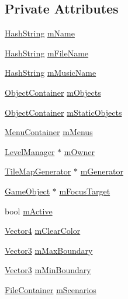 \subsection*{Private Attributes}
\begin{DoxyCompactItemize}
\item 
\hyperlink{classHashString}{Hash\+String} \hyperlink{classLevel_ae33d8a4a8a50bf09ce19ff784509e77b}{m\+Name}
\item 
\hyperlink{classHashString}{Hash\+String} \hyperlink{classLevel_af1e1923aba1e95e5a8e895f840460407}{m\+File\+Name}
\item 
\hyperlink{classHashString}{Hash\+String} \hyperlink{classLevel_af2e193876cae73a475abbe27a1a9f972}{m\+Music\+Name}
\item 
\hyperlink{classLevel_afd39ad8a5d9272ab8e14853e0fb18a48}{Object\+Container} \hyperlink{classLevel_a66c3ffb86f6e61570f833046e7994d43}{m\+Objects}
\item 
\hyperlink{classLevel_afd39ad8a5d9272ab8e14853e0fb18a48}{Object\+Container} \hyperlink{classLevel_afce9aca707faf2694e54e50f41feb035}{m\+Static\+Objects}
\item 
\hyperlink{classLevel_a8ca95fd4c2a029af4f4df92c24556314}{Menu\+Container} \hyperlink{classLevel_a42a19fd951df82d14d6848a09ea93d57}{m\+Menus}
\item 
\hyperlink{classLevelManager}{Level\+Manager} $\ast$ \hyperlink{classLevel_a577a9c893ac40f3b612f1d672d244338}{m\+Owner}
\item 
\hyperlink{classTileMapGenerator}{Tile\+Map\+Generator} $\ast$ \hyperlink{classLevel_abb613b8abaa789ca6a8ca7d9dd0630e8}{m\+Generator}
\item 
\hyperlink{classGameObject}{Game\+Object} $\ast$ \hyperlink{classLevel_a1bd8599f3ce15a8ae505fc84715e94c7}{m\+Focus\+Target}
\item 
bool \hyperlink{classLevel_a67463484bfba4f2bd5e9ea906a267f4a}{m\+Active}
\item 
\hyperlink{structVector4}{Vector4} \hyperlink{classLevel_a1138365d28ebc6c318fecb9bea2e4e26}{m\+Clear\+Color}
\item 
\hyperlink{structVector3}{Vector3} \hyperlink{classLevel_a7b30c9977eaba0ad2672f4f1a8880d7a}{m\+Max\+Boundary}
\item 
\hyperlink{structVector3}{Vector3} \hyperlink{classLevel_aa4c203935f8b10c2afca708cf4f79e4a}{m\+Min\+Boundary}
\item 
\hyperlink{classLevel_ace1da2e0393bc7528301ad2220c7f136}{File\+Container} \hyperlink{classLevel_a97db6fa7099a710cf9c953f41ea3f478}{m\+Scenarios}
\end{DoxyCompactItemize}


